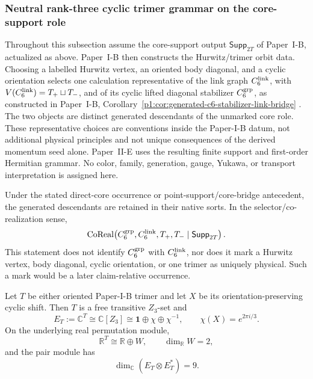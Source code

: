 \documentclass[12pt,a4paper]{article}
\begin{document}
\subsubsection{Neutral rank-three cyclic trimer grammar on the core-support role}
\label{p2:subsec:rank-three-trimer-grammar}

Throughout this subsection assume the core-support output
\(\mathsf{Supp}_{2T}\) of Paper~I-B, actualized as above.  Paper~I-B then constructs the
Hurwitz/trimer orbit data.  Choosing a
labelled Hurwitz vertex, an oriented body diagonal, and a cyclic orientation
selects one calculation representative of the link graph
\(C_6^{\rm link}\), with
\(V(C_6^{\rm link})=T_+\sqcup T_-\), and of its cyclic lifted diagonal
stabilizer \(C_6^{\rm grp}\), as constructed in Paper~I-B,
Corollary~\ref{p1:cor:generated-c6-stabilizer-link-bridge}
\cite{Kugelmann2026Paper1BExceptional}.  The two objects are
distinct generated descendants of the unmarked core role.  These
representative choices are conventions inside
the Paper-I-B datum, not additional physical principles and not unique
consequences of the derived momentum seed alone.  Paper~II-E uses the resulting
finite support and first-order Hermitian grammar.  No color, family, generation, gauge,
Yukawa, or transport interpretation is assigned here.

\begin{corollary}
\label{p2e:cor:core-descendant-corealization}
Under the stated direct-core occurrence or point-support/core-bridge antecedent,
the generated descendants are retained in their native sorts.  In the
selector/co-realization sense,
\[
 \operatorname{CoReal}\!\left(
 C_6^{\rm grp},C_6^{\rm link},T_+,T_-\mid\mathsf{Supp}_{2T}\right).
\]
This statement does not identify \(C_6^{\rm grp}\) with \(C_6^{\rm link}\), nor
does it mark a Hurwitz vertex, body diagonal, cyclic orientation, or one
trimer as uniquely physical.  Such a mark would be a later claim-relative
occurrence.
\end{corollary}

\begin{proposition}
\label{p2:prop:kinematic-cyclic-trimer-template}
Let \(T\) be either oriented Paper-I-B trimer and let \(X\) be its
orientation-preserving cyclic shift.  Then \(T\) is a free transitive
\(Z_3\)-set and
\[
 E_T:=\mathbb C^T\cong\mathbb C[Z_3]
 \cong\mathbf1\oplus\chi\oplus\chi^{-1},
 \qquad
 \chi(X)=e^{2\pi i/3}.
\]
On the underlying real permutation module,
\[
        \mathbb R^T\cong\mathbb R\oplus W,
        \qquad
        \dim_{\mathbb R}W=2,
\]
and the pair module has
\[
        \dim_{\mathbb C}(E_T\otimes E_T^*)=9.
\]
\end{proposition}
\end{document}
